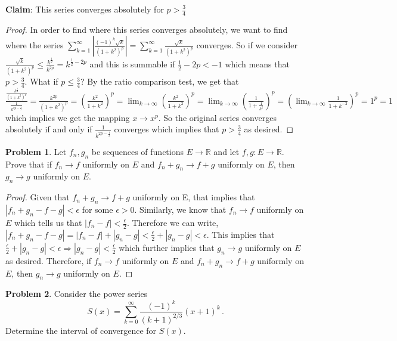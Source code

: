 \documentclass[11pt]{article}
\theoremstyle{definition}
\newtheorem{problem}{Problem}
\newcommand{\R}{\mathbb{R}}
\begin{document}
\textbf{Claim}: This series converges absolutely for $p > \frac{3}{4}$
\begin{proof}
In order to find where this series converges absolutely, we want to find where the series $\sum_{k=1}^\infty |\frac{(-1)^k \sqrt{k} }{(1 + k^2)^{p}}| = \sum_{k=1}^\infty \frac{ \sqrt{k} }{(1 + k^2)^{p}}$ converges. So if we consider $\frac{\sqrt{k}}{(1+k^2)^p} \leq \frac{k^{\frac{1}{2}}}{k^{2p}} = k^{\frac{1}{2} - 2p}$ and this is summable if $\frac{1}{2} - 2p < -1$ which means that $p > \frac{3}{4}$. What if $p \leq \frac{3}{4}$? By the ratio comparison test, we get that $\frac{\frac{k^{\frac{1}{2}}}{(1+k^2)^p}}{\frac{1}{k^{2p-\frac{1}{2}}}} = \frac{k^{2p}}{(1+k^2)^p} = (\frac{k^2}{1+k^2})^p = \lim_{k\to \infty}(\frac{k^2}{1+k^2})^p= \lim_{k\to \infty}(\frac{1}{1 + \frac{1}{k^2}})^p = (\lim_{k\to \infty}\frac{1}{1+k^{-2}})^p = 1^p = 1$ which implies we get the mapping $x \to x^p$. So the original series converges absolutely if and only if $\frac{1}{k^{2p-\frac{1}{2}}}$ converges which implies that $p > \frac{3}{4}$ as desired.
\end{proof}

\pagebreak
\begin{problem}
Let $f_n, g_n$ be sequences of functions $E \to \R$ and let $f, g : E \to \R$. Prove that if $f_n \to f$ uniformly on $E$ and $f_n + g_n \to f + g$ uniformly on $E$, then $g_n \to g$ uniformly on $E$. 
\end{problem}

\begin{proof}
Given that $f_n+g_n \to f + g$ uniformly on E, that implies that $|f_n+g_n - f - g| < \epsilon$ for some $\epsilon > 0$. Similarly, we know that $f_n \to f$ uniformly on $E$ which tells us that $|f_n - f| < \frac{\epsilon}{2}$. Therefore we can write, $|f_n + g_n - f - g| = |f_n -f| + |g_n-g|< \frac{\epsilon}{2} + |g_n - g| < \epsilon.$ This implies that $\frac{\epsilon}{2} + |g_n - g| < \epsilon \Rightarrow |g_n - g| < \frac{\epsilon}{2}$ which further implies that $g_n \to g$ uniformly on $E$ as desired. Therefore, if $f_n \to f$ uniformly on $E$ and $f_n + g_n \to f + g$ uniformly on $E$, then $g_n \to g$ uniformly on $E$.
\end{proof}

\pagebreak
\begin{problem}
Consider the power series
\[
S(x) = \sum_{k = 0}^\infty \frac{(-1)^k}{(k + 1)^{2/3}} (x+1)^k \,. 
\]
Determine the interval of convergence for $S(x)$. 
\end{problem}
\end{document}
